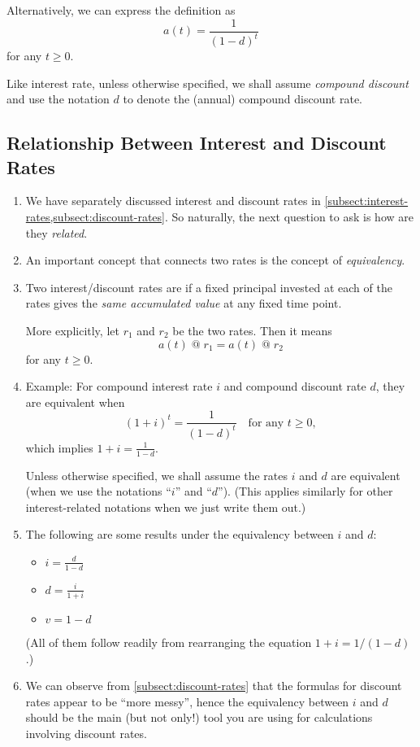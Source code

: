 \begin{enumerate}
\begin{remark}
\item Alternatively, we can express the definition as
\[
a(t)=\frac{1}{(1-d)^{t}}
\]
for any \(t\ge 0\).
\item Like interest rate, unless otherwise specified, we shall assume \emph{compound
discount} and use the notation \(d\) to denote the (annual) compound discount
rate.
\end{remark}
\end{enumerate}
\subsection{Relationship Between Interest and Discount Rates}
\begin{enumerate}
\item We have separately discussed interest and discount rates in
\cref{subsect:interest-rates,subsect:discount-rates}. So naturally, the next
question to ask is how are they \emph{related}.
\item An important concept that connects two rates is the concept of
\emph{equivalency}.
\item Two interest/discount rates are  if a fixed principal
 invested at each of the rates gives the \emph{same
accumulated value} at any fixed time point.

\begin{note}
More explicitly, let \(r_1\) and \(r_2\) be the two rates. Then it means
\[
a(t)\;@\;r_1 = a(t)\;@\;r_2
\]
for any \(t\ge 0\).
\end{note}

\item Example: For compound interest rate \(i\) and compound discount rate
\(d\), they are equivalent when
\[
(1+i)^{t}=\frac{1}{(1-d)^{t}}\quad\text{for any \(t\ge 0\)},
\]
which implies \(\displaystyle 1+i=\frac{1}{1-d}\).

\begin{note}
Unless otherwise specified, we shall assume the rates \(i\) and \(d\) are
equivalent (when we use the notations ``\(i\)'' and ``\(d\)''). (This applies
similarly for other interest-related notations when we just write them out.)
\end{note}

\item \label{it:id-equiv-fmlas}
The following are some results under the equivalency between \(i\) and \(d\):
\begin{itemize}
\item \(\displaystyle i=\frac{d}{1-d}\)
\item \(\displaystyle d=\frac{i}{1+i}\)
\item \(v=1-d\)
\end{itemize}
(All of them follow readily from rearranging the equation \(1+i=1/(1-d)\).)

\item We can observe from \cref{subsect:discount-rates} that the formulas for
discount rates appear to be ``more messy'', hence the equivalency between \(i\)
and \(d\) should be the main (but not only!) tool you are using for
calculations involving discount rates.
\end{enumerate}
